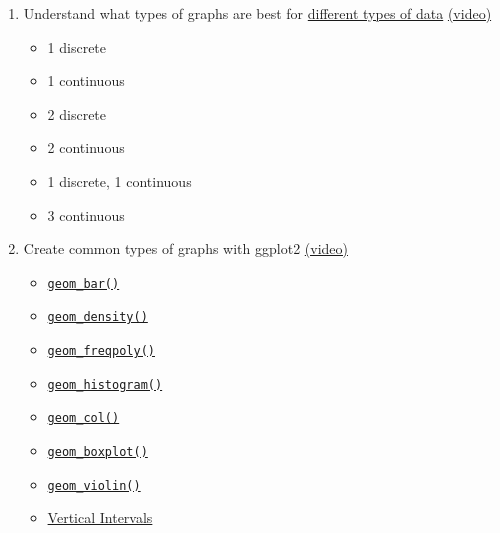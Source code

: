 \documentclass[
  oneside]{book}
\providecommand{\tightlist}{%
  \setlength{\itemsep}{0pt}\setlength{\parskip}{0pt}}
\begin{document}
\begin{enumerate}
\def\labelenumi{\arabic{enumi}.}
\tightlist
\item
  Understand what types of graphs are best for \protect\hyperlink{vartypes}{different types of data} \href{https://youtu.be/tOFQFPRgZ3M}{(video)}

  \begin{itemize}
  \tightlist
  \item
    1 discrete
  \item
    1 continuous
  \item
    2 discrete
  \item
    2 continuous
  \item
    1 discrete, 1 continuous
  \item
    3 continuous
  \end{itemize}
\item
  Create common types of graphs with ggplot2 \href{https://youtu.be/kKlQupjD__g}{(video)}

  \begin{itemize}
  \tightlist
  \item
    \protect\hyperlink{geom_bar}{\texttt{geom\_bar()}}
  \item
    \protect\hyperlink{geom_density}{\texttt{geom\_density()}}
  \item
    \protect\hyperlink{geom_freqpoly}{\texttt{geom\_freqpoly()}}
  \item
    \protect\hyperlink{geom_histogram}{\texttt{geom\_histogram()}}
  \item
    \protect\hyperlink{geom_col}{\texttt{geom\_col()}}
  \item
    \protect\hyperlink{geom_boxplot}{\texttt{geom\_boxplot()}}
  \item
    \protect\hyperlink{geom_violin}{\texttt{geom\_violin()}}
  \item
    \protect\hyperlink{vertical_intervals}{Vertical Intervals}


\end{itemize}
\end{enumerate}
\end{document}
